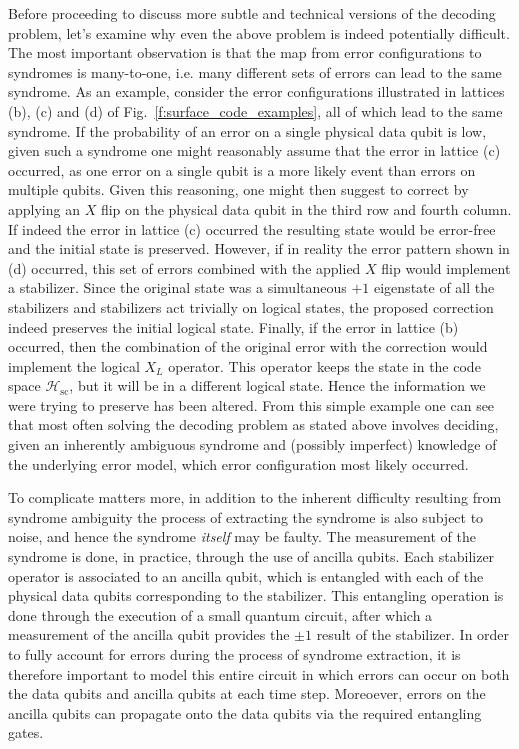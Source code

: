 \documentclass[twocolumn,preprintnumbers,amsmath,amssymb,notitlepage,nofootinbib,longbibliography,superscriptaddress,aps,pra,10pt]{revtex4-1}
\begin{document}
	\noindent Before proceeding to discuss more subtle and technical versions of the decoding problem, let's examine why even the above problem is indeed potentially difficult.
	The most important observation is that the map from error configurations to syndromes is many-to-one, i.e. many different sets of errors can lead to the same syndrome.
	As an example, consider the error configurations illustrated in lattices (b), (c) and (d) of Fig.~\ref{f:surface_code_examples}, all of which lead to the same syndrome.
	If the probability of an error on a single physical data qubit is low, given such a syndrome one might reasonably assume that the error in lattice (c) occurred,
	as one error on a single qubit is a more likely event than errors on multiple qubits.
	Given this reasoning, one might then suggest to correct by applying an $X$ flip on the physical data qubit in the third row and fourth column.
	If indeed the error in lattice (c) occurred the resulting state would be error-free and the initial state is preserved.
	However, if in reality the error pattern shown in (d) occurred, this set of errors combined with the applied $X$ flip would implement a stabilizer.
	Since the original state was a simultaneous $+1$ eigenstate of all the stabilizers and stabilizers act trivially on logical states, the
	proposed correction indeed preserves the initial logical state.
	Finally, if the error in lattice (b) occurred, then the combination of the original error with the correction would implement the logical $X_L$ operator.
	This operator keeps the state in the code space $\mathcal{H}_\textrm{sc}$, but it will be in a different logical state. Hence the information we were trying to
	preserve has been altered. From this simple example one can see that most often solving the decoding problem as stated above involves deciding,
	given an inherently ambiguous syndrome and (possibly imperfect) knowledge of the underlying error model, which error configuration most likely occurred.

	To complicate matters more, in addition to the inherent difficulty resulting from syndrome ambiguity the process of extracting the syndrome is also subject to noise,
	and hence the syndrome \textit{itself} may be faulty. The measurement of the syndrome is done, in practice, through the use of ancilla qubits. Each stabilizer operator
	is associated to an ancilla qubit, which is entangled with each of the physical data qubits corresponding to the stabilizer. This entangling operation is done through
	the execution of a small quantum circuit, after which a measurement of the ancilla qubit provides the $\pm 1$ result of the stabilizer.
	In order to fully account for errors during the process of syndrome extraction, it is therefore important to model this entire circuit in which errors can occur on
	both the data qubits and ancilla qubits at each time step. Moreoever, errors on the ancilla qubits can propagate onto the data qubits via the required entangling gates.
\end{document}
